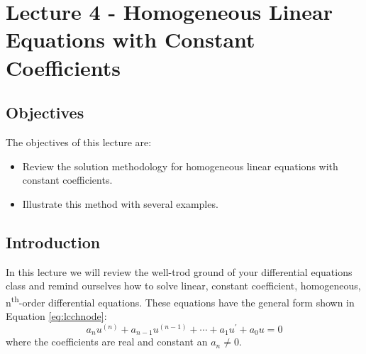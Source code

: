 \chapter{Lecture 4 - Homogeneous Linear Equations with Constant Coefficients}
\label{ch:lec4}
\section{Objectives}
The objectives of this lecture are:
\begin{itemize}
\item Review the solution methodology for homogeneous linear equations with constant coefficients.
\item Illustrate this method with several examples.
\end{itemize}
\section{Introduction}
In this lecture we will review the well-trod ground of your differential equations class and remind ourselves how to solve linear, constant coefficient, homogeneous, n\textsuperscript{th}-order differential equations.  These equations have the general form shown in Equation \ref{eq:lcchnode}:
\begin{equation}
a_nu^{(n)}+a_{n-1}u^{(n-1)}+\cdots+a_1u^{\prime}+a_0u=0
\label{eq:lcchnode}
\end{equation}
\noindent where the coefficients are real and constant an $a_n \ne 0$.

